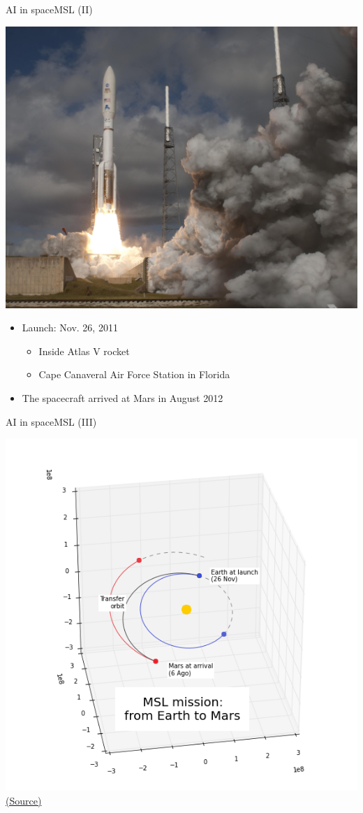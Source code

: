 \documentclass[10pt,compress]{beamer} %
\begin{document}
{	\begin{frame}{AI in space}{MSL (II)}
		\begin{center}
			\includegraphics[width=0.4\linewidth]{figs/msllaunch.jpg}
		\end{center}
		\begin{itemize}
			\item Launch: Nov. 26, 2011
			\begin{itemize}
				\item Inside Atlas V rocket
		 		\item Cape Canaveral Air Force Station in Florida
			\end{itemize}
		 	\item The spacecraft arrived at Mars in August 2012
		\end{itemize}
	\end{frame}

	\begin{frame}{AI in space}{MSL (III)}
		\vspace{-0.2cm}
		\begin{center}
			\includegraphics[width=0.6\linewidth]{figs/mslorbit.png}\\
			\tiny{\href{http://poliastro.readthedocs.org/en/latest/user_guide.html}{(Source)}}
		\end{center}
	\end{frame}

}
\end{document}
